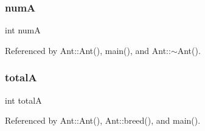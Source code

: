 \subsubsection{numA}
{\footnotesize\ttfamily int numA}



Referenced by Ant\+::\+Ant(), main(), and Ant\+::$\sim$\+Ant().

\mbox{\label{Ant_8cpp_a67d303aa718fb075f8c279ff737e7084}} 
\subsubsection{totalA}
{\footnotesize\ttfamily int totalA}



Referenced by Ant\+::\+Ant(), Ant\+::breed(), and main().

